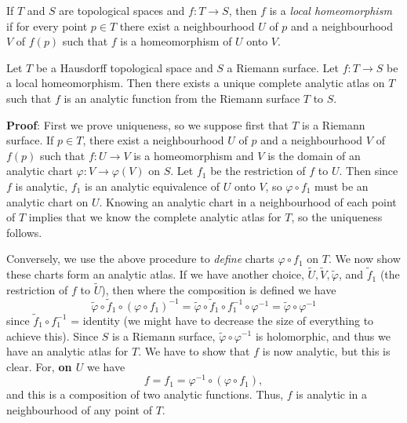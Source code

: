 \documentclass[a4paper,11pt]{article}
\begin{document}
\begin{defn}
  \label{def:1}
  If $T$ and $S$ are topological spaces and $f : T \to S$, then $f$ is
  a \emph{local homeomorphism} if for every point $p \in T$ there
  exist a neighbourhood $U$ of $p$ and a neighbourhood $V$ of $f(p)$
  such that $f$ is a homeomorphism of $U$ onto $V$.
\end{defn}

\begin{lem}
  \label{lem:1}
  Let $T$ be a Hausdorff topological space and $S$ a Riemann surface.
  Let $f : T \to S$ be a local homeomorphism.  Then there exists a
  unique complete analytic atlas on $T$ such that $f$ is an analytic
  function from the Riemann surface $T$ to $S$.
\end{lem}

\begin{mdframed}
  \textbf{Proof}:
  First we prove uniqueness, so we suppose first that $T$ is a Riemann
  surface.  If $p \in T$, there exist a neighbourhood $U$ of $p$ and
  a neighbourhood $V$ of $f(p)$ such that $f : U \to V$ is a
  homeomorphism and $V$ is the domain of an analytic chart $\varphi :
  V \to \varphi(V)$ on $S$.  Let $f_1$ be the restriction of $f$ to
  $U$.  Then since $f$ is analytic, $f_1$ is an analytic equivalence
  of $U$ onto $V$, so $\varphi \circ f_1$ must be an analytic chart on
  $U$.  Knowing an analytic chart in a neighbourhood of each point of
  $T$ implies that we know the complete analytic atlas for $T$, so the
  uniqueness follows.

  Conversely, we use the above procedure to \emph{define} charts
  $\varphi \circ f_1$ on $T$.  We now show these charts form an
  analytic atlas.  If we have another choice, $\widetilde{U},
  \widetilde{V}, \widetilde{\varphi}$, and $\widetilde{f}_1$ (the
  restriction of $f$ to $\widetilde{U}$), then where the composition
  is defined we have
  $$
  \widetilde{\varphi} \circ \widetilde{f}_1 \circ
  (\varphi \circ f_1)^{-1}
  = \widetilde{\varphi} \circ \widetilde{f}_1 \circ
  f_1^{-1} \circ \varphi^{-1} 
  = \widetilde{\varphi} \circ \varphi^{-1}
  $$
  since $\widetilde{f}_1 \circ f_1^{-1}$ = identity (we might have to
  decrease the size of everything to achieve this).  Since $S$ is a
  Riemann surface, $\widetilde{\varphi} \circ \varphi^{-1}$ is
  holomorphic, and thus we have an analytic atlas for $T$.  We have to
  show that $f$ is now analytic, but this is clear.  For, \textbf{on
    $U$} we have
  $$
  f = f_1 = \varphi^{-1} \circ (\varphi \circ f_1),
  $$
  and this is a composition of two analytic functions.  Thus, $f$ is
  analytic in a neighbourhood of any point of $T$.
\end{mdframed}
\end{document}

